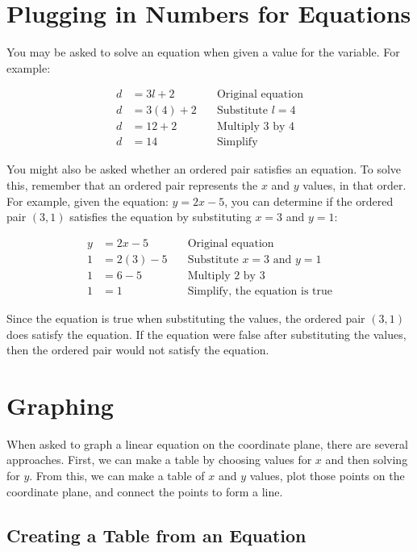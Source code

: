 \documentclass[12pt]{article}
\begin{document}
\section{Plugging in Numbers for Equations}

You may be asked to solve an equation when given a value for the variable. For
example:

\begin{align*}
  d & = 3l + 2 \quad   & \text{Original equation} \\
  d & = 3(4) + 2 \quad & \text{Substitute } l = 4 \\
  d & = 12 + 2 \quad   & \text{Multiply 3 by 4}   \\
  d & = 14 \quad       & \text{Simplify}
\end{align*}

You might also be asked whether an ordered pair satisfies an equation. To solve
this, remember that an ordered pair represents the $x$ and $y$ values, in that
order. For example, given the equation: $y = 2x - 5$, you can determine if the
ordered pair $(3, 1)$ satisfies the equation by substituting $x = 3$ and $y =
  1$:

\begin{align*}
  y & = 2x - 5         & \text{Original equation}                    \\
  1 & = 2(3) - 5 \quad & \text{Substitute } x = 3 \text{ and } y = 1 \\
  1 & = 6 - 5 \quad    & \text{Multiply 2 by 3}                      \\
  1 & = 1 \quad        & \text{Simplify, the equation is true}
\end{align*}

Since the equation is true when substituting the values, the ordered pair $(3,
  1)$ does satisfy the equation. If the equation were false after substituting the
values, then the ordered pair would not satisfy the equation.

\section{Graphing}

When asked to graph a linear equation on the coordinate plane, there are several
approaches. First, we can make a table by choosing values for $x$ and then
solving for $y$. From this, we can make a table of $x$ and $y$ values, plot
those points on the coordinate plane, and connect the points to form a line.

\subsection{Creating a Table from an Equation}
\end{document}
